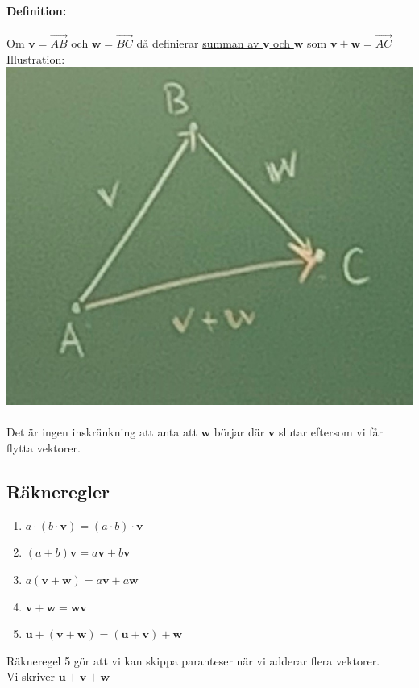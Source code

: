     \paragraph{Definition:} Om $\bm{v}=\overrightarrow{AB}$ och $\bm{w}=\overrightarrow{BC}$ då definierar \underline{summan av $\bm{v}$ och $\bm{w}$} som $\bm{v}+\bm{w}=\overrightarrow{AC}$\\
    Illustration:\\
    \includegraphics[scale=0.25]{imgs/22-01-17-img01.jpg}
    ~\\      
    Det är ingen inskränkning att anta att $\bm{w}$ börjar där $\bm{v}$ slutar eftersom vi får flytta vektorer.
    
    \subsection{Räkneregler}
    \begin{enumerate}
        \item $a\cdot (b\cdot \bm{v})=(a\cdot b)\cdot \bm{v}$
        \item $(a+b)\bm{v}=a\bm{v}+b\bm{v}$
        \item $a(\bm{v}+\bm{w})=a\bm{v}+a\bm{w}$
        \item $\bm{v}+\bm{w}=\bm{w}\bm{v}$
        \item $\bm{u}+(\bm{v}+\bm{w})=(\bm{u}+\bm{v})+\bm{w}$
    \end{enumerate}
    Räkneregel 5 gör att vi kan skippa paranteser när vi adderar flera vektorer.\\
    Vi skriver $\bm{u}+\bm{v}+\bm{w}$
